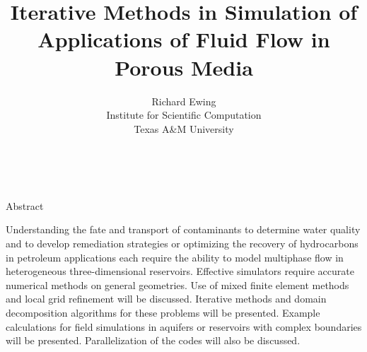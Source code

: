 \documentclass[11pt]{article}
\date{ ~ \hspace{-4mm}}
\title{Iterative Methods in Simulation of Applications of Fluid Flow in Porous Media  }
\author{Richard Ewing  \\  Institute for Scientific Computation  \\  Texas A\&M University}
\begin{document}
\maketitle
\thispagestyle{empty}


 {\bf 



Abstract



}



Understanding the fate and transport of contaminants to determine water quality and to develop remediation strategies or optimizing the recovery of hydrocarbons in petroleum applications each require the ability to model multiphase flow in heterogeneous three-dimensional reservoirs. Effective simulators require accurate numerical methods on general geometries. Use of mixed finite element methods and local grid refinement will be discussed. Iterative methods and domain decomposition algorithms for these problems will be presented. Example calculations for field simulations in aquifers or reservoirs with complex boundaries will be presented. Parallelization of the codes will also be discussed.
\end{document}
